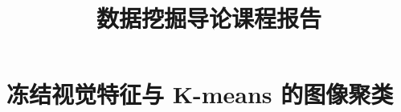 \documentclass[sigconf,nonacm,screen,balance=false]{acmart}
\title[数据挖掘导论课程报告]{数据挖掘导论课程报告}
\begin{document}
\raggedbottom
\maketitle
\section{冻结视觉特征与 K-means 的图像聚类}
\label{sec:task1}


\FloatBarrier


\end{document}

